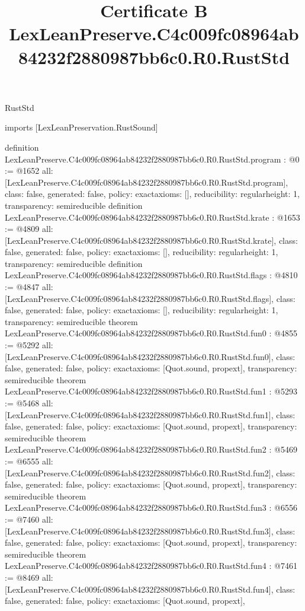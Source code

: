 \begin{lexlean}{RustStd}
\title{Certificate B LexLeanPreserve.C4c009fc08964ab84232f2880987bb6c0.R0.RustStd}
\begin{coremodule}
imports [LexLeanPreservation.RustSound]

definition LexLeanPreserve.C4c009fc08964ab84232f2880987bb6c0.R0.RustStd.program : @0 := @1652 {
  all: [LexLeanPreserve.C4c009fc08964ab84232f2880987bb6c0.R0.RustStd.program],
  class: false,
  generated: false,
  policy: exact{axioms: []},
  reducibility: regular{height: 1},
  transparency: semireducible
}
definition LexLeanPreserve.C4c009fc08964ab84232f2880987bb6c0.R0.RustStd.krate : @1653 := @4809 {
  all: [LexLeanPreserve.C4c009fc08964ab84232f2880987bb6c0.R0.RustStd.krate],
  class: false,
  generated: false,
  policy: exact{axioms: []},
  reducibility: regular{height: 1},
  transparency: semireducible
}
definition LexLeanPreserve.C4c009fc08964ab84232f2880987bb6c0.R0.RustStd.flags : @4810 := @4847 {
  all: [LexLeanPreserve.C4c009fc08964ab84232f2880987bb6c0.R0.RustStd.flags],
  class: false,
  generated: false,
  policy: exact{axioms: []},
  reducibility: regular{height: 1},
  transparency: semireducible
}
theorem LexLeanPreserve.C4c009fc08964ab84232f2880987bb6c0.R0.RustStd.fun0 : @4855 := @5292 {
  all: [LexLeanPreserve.C4c009fc08964ab84232f2880987bb6c0.R0.RustStd.fun0],
  class: false,
  generated: false,
  policy: exact{axioms: [Quot.sound, propext]},
  transparency: semireducible
}
theorem LexLeanPreserve.C4c009fc08964ab84232f2880987bb6c0.R0.RustStd.fun1 : @5293 := @5468 {
  all: [LexLeanPreserve.C4c009fc08964ab84232f2880987bb6c0.R0.RustStd.fun1],
  class: false,
  generated: false,
  policy: exact{axioms: [Quot.sound, propext]},
  transparency: semireducible
}
theorem LexLeanPreserve.C4c009fc08964ab84232f2880987bb6c0.R0.RustStd.fun2 : @5469 := @6555 {
  all: [LexLeanPreserve.C4c009fc08964ab84232f2880987bb6c0.R0.RustStd.fun2],
  class: false,
  generated: false,
  policy: exact{axioms: [Quot.sound, propext]},
  transparency: semireducible
}
theorem LexLeanPreserve.C4c009fc08964ab84232f2880987bb6c0.R0.RustStd.fun3 : @6556 := @7460 {
  all: [LexLeanPreserve.C4c009fc08964ab84232f2880987bb6c0.R0.RustStd.fun3],
  class: false,
  generated: false,
  policy: exact{axioms: [Quot.sound, propext]},
  transparency: semireducible
}
theorem LexLeanPreserve.C4c009fc08964ab84232f2880987bb6c0.R0.RustStd.fun4 : @7461 := @8469 {
  all: [LexLeanPreserve.C4c009fc08964ab84232f2880987bb6c0.R0.RustStd.fun4],
  class: false,
  generated: false,
  policy: exact{axioms: [Quot.sound, propext]},
}
\end{coremodule}
\end{lexlean}
